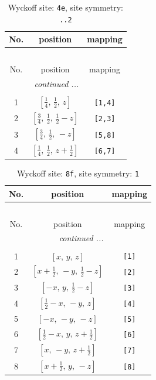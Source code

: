 \documentclass[fleqn,8pt]{jsarticle}
\begin{document}
\renewcommand{\arraystretch}{1.2}
\begin{longtable}{ccc}
\caption{Wyckoff site: {\tt 4e}, site symmetry: {\tt ..2}}
 \\
 \hline \hline
No. & position & mapping \\ \hline \endfirsthead

\multicolumn{2}{l}{\tablename\ \thetable{}} \\
 \hline \hline
No. & position & mapping \\ \hline \endhead

 \hline \hline
\multicolumn{2}{r}{\footnotesize\it continued ...} \\ \endfoot

 \hline \hline
\multicolumn{2}{r}{} \\ \endlastfoot

1 & $\left[ \frac{1}{4},\, \frac{1}{2},\, z \right]$ & {\tt [1,4]} \\ \hline
2 & $\left[ \frac{3}{4},\, \frac{1}{2},\, \frac{1}{2} - z \right]$ & {\tt [2,3]} \\ \hline
3 & $\left[ \frac{3}{4},\, \frac{1}{2},\, - z \right]$ & {\tt [5,8]} \\ \hline
4 & $\left[ \frac{1}{4},\, \frac{1}{2},\, z + \frac{1}{2} \right]$ & {\tt [6,7]} \\
\end{longtable}
\renewcommand{\arraystretch}{1.2}
\begin{longtable}{ccc}
\caption{Wyckoff site: {\tt 8f}, site symmetry: {\tt 1}}
 \\
 \hline \hline
No. & position & mapping \\ \hline \endfirsthead

\multicolumn{2}{l}{\tablename\ \thetable{}} \\
 \hline \hline
No. & position & mapping \\ \hline \endhead

 \hline \hline
\multicolumn{2}{r}{\footnotesize\it continued ...} \\ \endfoot

 \hline \hline
\multicolumn{2}{r}{} \\ \endlastfoot

1 & $\left[ x,\, y,\, z \right]$ & {\tt [1]} \\ \hline
2 & $\left[ x + \frac{1}{2},\, - y,\, \frac{1}{2} - z \right]$ & {\tt [2]} \\ \hline
3 & $\left[ - x,\, y,\, \frac{1}{2} - z \right]$ & {\tt [3]} \\ \hline
4 & $\left[ \frac{1}{2} - x,\, - y,\, z \right]$ & {\tt [4]} \\ \hline
5 & $\left[ - x,\, - y,\, - z \right]$ & {\tt [5]} \\ \hline
6 & $\left[ \frac{1}{2} - x,\, y,\, z + \frac{1}{2} \right]$ & {\tt [6]} \\ \hline
7 & $\left[ x,\, - y,\, z + \frac{1}{2} \right]$ & {\tt [7]} \\ \hline
8 & $\left[ x + \frac{1}{2},\, y,\, - z \right]$ & {\tt [8]} \\
\end{longtable}
\end{document}
